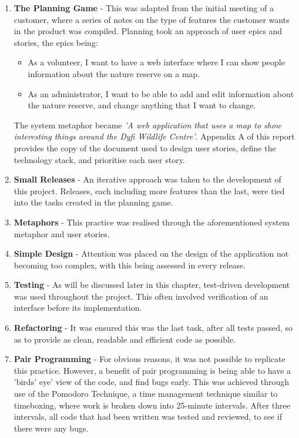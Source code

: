 \begin{enumerate}
\item \textbf{The Planning Game} - This was adapted from the initial meeting of a customer, where a series of notes on the type of features the customer wants in the product was compiled. Planning took an approach of user epics and stories, the epics being:
	\begin{itemize}
		\item	As a volunteer, I want to have a web interface where I can show people information about the nature reserve on a map.
		\item	As an administrator, I want to be able to add and edit information about the nature reserve, and change anything that I want to change.
	\end{itemize}
	
The system metaphor became \textit{'A web application that uses a map to show interesting things around the Dyfi Wildlife Centre'}. Appendix A of this report provides the copy of the document used to design user stories, define the technology stack, and prioritise each user story.
\item	\textbf{Small Releases} - An iterative approach was taken to the development of this project. Releases, each including more features than the last, were tied into the tasks created in the planning game.
\item	\textbf{Metaphors} - This practice was realised through the aforementioned system metaphor and user stories.
\item	\textbf{Simple Design} - Attention was placed on the design of the application not becoming too complex, with this being assessed in every release.
\item	\textbf{Testing} - As will be discussed later in this chapter, test-driven development was used throughout the project. This often involved verification of an interface before its implementation.
\item	\textbf{Refactoring} - It was ensured this was the last task, after all tests passed, so as to provide as clean, readable and efficient code as possible.
\item	\textbf{Pair Programming} - For obvious reasons, it was not possible to replicate this practice. However, a benefit of pair programming is being able to have a 'birds' eye' view of the code, and find bugs early. This was achieved through use of the Pomodoro Technique, a time management technique similar to timeboxing, where work is broken down into 25-minute intervals. After three intervals, all code that had been written was tested and reviewed, to see if there were any bugs. %

\end{enumerate}
